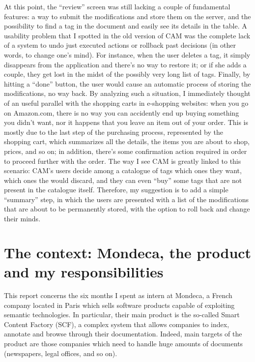 \documentclass[12pt,oneside,svgnames]{memoir}
\begin{document}
At this point, the ``review'' screen was still lacking a couple of
fundamental features: a way to submit the modifications and store them
on the server, and the possibility to find a tag in the document and
easily see its details in the table. A usability problem that I spotted
in the old version of CAM was the complete lack of a system to undo just
executed actions or rollback past decisions (in other words, to change
one's mind). For instance, when the user deletes a tag, it simply
disappears from the application and there's no way to restore it; or if
she adds a couple, they get lost in the midst of the possibly very long
list of tags. Finally, by hitting a ``done'' button, the user would
cause an automatic process of storing the modifications, no way back. By
analyzing such a situation, I immediately thought of an useful parallel
with the shopping carts in e-shopping websites: when you go on
Amazon.com, there is no way you can accidently end up buying something
you didn't want, nor it happens that you leave an item out of your
order. This is mostly due to the last step of the purchasing process,
represented by the shopping cart, which summarizes all the details, the
items you are about to shop, prices, and so on; in addition, there's
some confirmation action required in order to proceed further with the
order. The way I see CAM is greatly linked to this scenario: CAM's users
decide among a catalogue of tags which ones they want, which ones the
would discard, and they can even ``buy'' some tags that are not present
in the catalogue itself. Therefore, my suggestion is to add a simple
``summary'' step, in which the users are presented with a list of the
modifications that are about to be permanently stored, with the option
to roll back and change their minds.

\chapter{The context: Mondeca, the product and my
responsibilities}\label{the-context-mondeca-the-product-and-my-responsibilities}

This report concerns the six months I spent as intern at Mondeca, a
French company located in Paris which sells software products capable of
exploiting semantic technologies. In particular, their main product is
the so-called Smart Content Factory (SCF), a complex system that allows
companies to index, annotate and browse through their documentation.
Indeed, main targets of the product are those companies which need to
handle huge amounts of documents (newspapers, legal offices, and so on).
\end{document}
